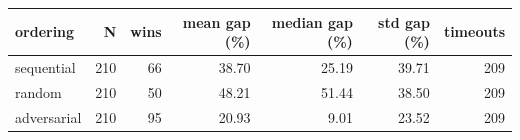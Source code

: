 \begin{tabular}{lrrrrrr}
\hline
ordering & N & wins & mean gap (\%) & median gap (\%) & std gap (\%) & timeouts \\
\hline
sequential & 210 & 66 & 38.70 & 25.19 & 39.71 & 209 \\
random & 210 & 50 & 48.21 & 51.44 & 38.50 & 209 \\
adversarial & 210 & 95 & 20.93 & 9.01 & 23.52 & 209 \\
\hline
\end{tabular}
